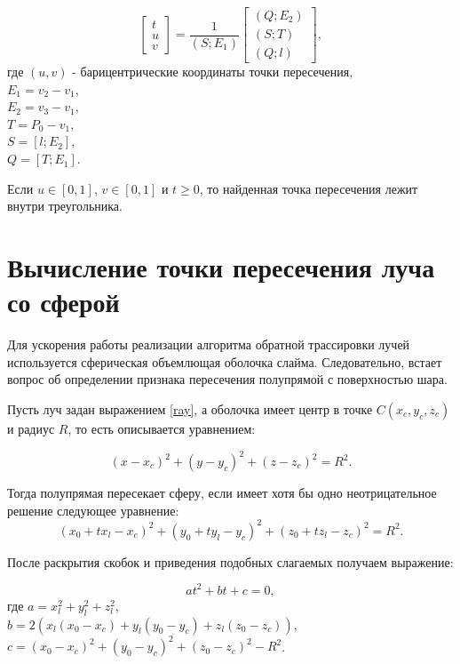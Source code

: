 \begin{equation}\label{bar}
	\begin{bmatrix}
		t\\
		u\\
		v
	\end{bmatrix}
	= \frac{1}{(S; E_1)}
	\begin{bmatrix}
		(Q; E_2)\\
		(S; T)\\
		(Q; l)
	\end{bmatrix},
\end{equation}
где $(u, v)$ - барицентрические координаты точки пересечения,\\
\text{~~~~~~}$E_1 = v_2 - v_1$,\\
\text{~~~~~~}$E_2 = v_3 - v_1$,\\
\text{~~~~~~}$T = P_0 - v_1$,\\
\text{~~~~~~}$S = [l; E_2]$,\\
\text{~~~~~~}$Q = [T; E_1]$.

Если $u \in [0, 1]$, $v \in [0, 1]$ и $t \ge 0$, то найденная точка пересечения лежит внутри треугольника.

\section{Вычисление точки пересечения луча со сферой}

Для ускорения работы реализации алгоритма обратной трассировки лучей используется сферическая объемлющая оболочка слайма. Следовательно, встает вопрос об определении признака пересечения полупрямой с поверхностью шара.

Пусть луч задан выражением \eqref{ray}, а оболочка имеет центр в точке $C(x_c, y_c, z_c)$ и радиус $R$, то есть описывается уравнением:

\begin{equation}\label{sphere}
	(x - x_c)^2 + (y - y_c)^2 + (z - z_c)^2 = R^2.
\end{equation}

Тогда полупрямая пересекает сферу, если имеет хотя бы одно неотрицательное решение следующее уравнение:
\begin{equation}\label{spheq1}
	(x_0 + tx_l - x_c)^2 + (y_0 + ty_l - y_c)^2 + (z_0 + tz_l - z_c)^2 = R^2.
\end{equation}

После раскрытия скобок и приведения подобных слагаемых получаем выражение:

\begin{equation}\label{spheq2}
	at^2 + bt + c = 0,
\end{equation}
где $a = x_l^2 + y_l^2 + z_l^2$,\\
\text{~~~~~~}$b = 2(x_l(x_0 - x_c) + y_l(y_0 - y_c) + z_l(z_0 - z_c))$,\\
\text{~~~~~~}$c = (x_0 - x_c)^2 + (y_0 - y_c)^2 + (z_0 - z_c) ^ 2 - R^2$.

